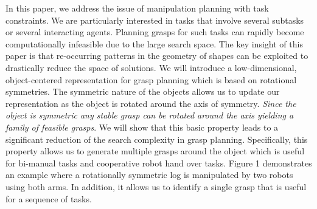 \documentclass[a4paper,10pt,twocolumn]{article}
\begin{document}
In this paper, we address the issue of manipulation planning with task constraints. We are
particularly interested in tasks that involve several subtasks or several interacting agents.
Planning grasps for such tasks can rapidly become computationally infeasible due to the large search
space. The key insight of this paper is that re-occurring patterns in the geometry of shapes can be
exploited to drastically reduce the space of solutions. We will introduce a low-dimensional,
object-centered representation for grasp planning which is based on rotational symmetries. The
symmetric nature of the objects allows us to update our representation as the object is rotated around
the axis of symmetry. \emph{Since the object is symmetric any stable grasp can be rotated around the
axis yielding a family of feasible grasps}. We will show that this basic property leads to a
significant reduction of the search complexity in grasp planning. Specifically, this property allows us
to generate multiple grasps around the object which is useful for bi-manual tasks and cooperative
robot hand over tasks. Figure 1 demonstrates an example where a rotationally symmetric log is manipulated by two robots using both arms. In addition, it allows us to identify a single grasp that is useful for a
sequence of tasks.
\end{document}
